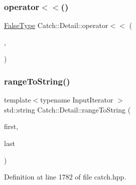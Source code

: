 \subsubsection{\texorpdfstring{operator$<$$<$()}{operator<<()}}
{\footnotesize\ttfamily \hyperlink{struct_catch_1_1_detail_1_1_false_type}{False\+Type} Catch\+::\+Detail\+::operator$<$$<$ (\begin{DoxyParamCaption}\item[{std\+::ostream const \&}]{,  }\item[{\hyperlink{struct_catch_1_1_detail_1_1_borg_type}{Borg\+Type} const \&}]{ }\end{DoxyParamCaption})}

\hypertarget{namespace_catch_1_1_detail_a6650a1dff325bf29962ff15ae73fd972}{}\label{namespace_catch_1_1_detail_a6650a1dff325bf29962ff15ae73fd972} 
\subsubsection{\texorpdfstring{range\+To\+String()}{rangeToString()}}
{\footnotesize\ttfamily template$<$typename Input\+Iterator $>$ \\
std\+::string Catch\+::\+Detail\+::range\+To\+String (\begin{DoxyParamCaption}\item[{Input\+Iterator}]{first,  }\item[{Input\+Iterator}]{last }\end{DoxyParamCaption})}



Definition at line 1782 of file catch.\+hpp.

